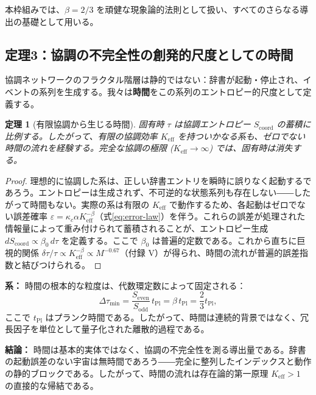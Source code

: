 \documentclass[12pt,a4paper]{article}
\newtheorem{theorem}{定理}[section]
\begin{document}
	本枠組みでは、\(\beta = 2/3\) を頑健な現象論的法則として扱い、すべてのさらなる導出の基礎として用いる。
	
	\subsection{定理3：協調の不完全性の創発的尺度としての時間}
	\label{subsec:time-emergence}
	
	協調ネットワークのフラクタル階層は静的ではない：辞書が起動・停止され、イベントの系列を生成する。我々は\textbf{時間}をこの系列のエントロピー的尺度として定義する。
	
	\begin{theorem}[有限協調から生じる時間]
		\label{thm:time}
		固有時 \(\tau\) は協調エントロピー \(S_{\mathrm{coord}}\) の蓄積に比例する。したがって、有限の協調効率 \(K_{\mathrm{eff}}\) を持ついかなる系も、ゼロでない時間の流れを経験する。完全な協調の極限 (\(K_{\mathrm{eff}} \to \infty\)) では、固有時は消失する。
	\end{theorem}
	
	\begin{proof}
		理想的に協調した系は、正しい辞書エントリを瞬時に誤りなく起動するであろう。エントロピーは生成されず、不可逆的な状態系列も存在しない――したがって時間もない。実際の系は有限の \(K_{\mathrm{eff}}\) で動作するため、各起動はゼロでない誤差確率 \(\varepsilon = \kappa_c \alpha K_{\mathrm{eff}}^{-\beta}\)（式\ref{eq:error-law}）を伴う。これらの誤差が処理された情報量によって重み付けられて蓄積されることが、エントロピー生成 \(dS_{\mathrm{coord}} \propto \beta_0 \, d\tau\) を定義する。ここで \(\beta_0\) は普遍的定数である。これから直ちに巨視的関係 \(\delta\tau/\tau \propto K_{\mathrm{eff}}^{-\beta} \propto M^{-0.67}\)（付録 V）が得られ、時間の流れが普遍的誤差指数と結びつけられる。
	\end{proof}
	
	\noindent
	\textbf{系：} 時間の根本的な粒度は、代数環定数によって固定される：
	\[
	\Delta \tau_{\min} = \frac{S_{\mathrm{even}}}{S_{\mathrm{odd}}} \, t_{\mathrm{Pl}}
	= \beta \, t_{\mathrm{Pl}} = \frac{2}{3} t_{\mathrm{Pl}},
	\]
	ここで \(t_{\mathrm{Pl}}\) はプランク時間である。したがって、時間は連続的背景ではなく、冗長因子を単位として量子化された離散的過程である。
	
	\noindent
	\textbf{結論：} 時間は基本的実体ではなく、協調の不完全性を測る導出量である。辞書の起動誤差のない宇宙は無時間であろう――完全に整列したインデックスと動作の静的ブロックである。したがって、時間の流れは存在論的第一原理 \(K_{\mathrm{eff}} > 1\) の直接的な帰結である。
	
\end{document}
